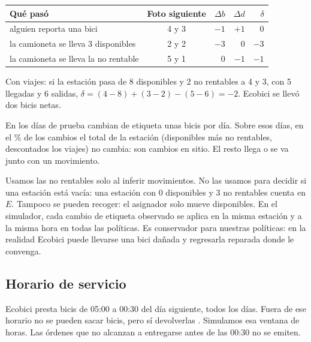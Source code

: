 \documentclass[conference,letterpaper,10pt]{IEEEtran}
\begin{document}
\begin{center}\footnotesize
\begin{tabular}{@{}lcrrr@{}}
\toprule
Qué pasó & Foto siguiente & $\Delta b$ & $\Delta d$ & $\delta$ \\
\midrule
alguien reporta una bici & 4 y 3 & $-1$ & $+1$ & 0 \\
la camioneta se lleva 3 disponibles & 2 y 2 & $-3$ & 0 & $-3$ \\
la camioneta se lleva la no rentable & 5 y 1 & 0 & $-1$ & $-1$ \\
\bottomrule
\end{tabular}
\end{center}

Con viajes: si la estación pasa de 8 disponibles y 2 no rentables a 4 y 3, con 5 llegadas y 6 salidas, $\delta=(4-8)+(3-2)-(5-6)=-2$. Ecobici se llevó dos bicis netas.

En los \rdias{} días de prueba cambian de etiqueta unas \retiquetasDia{} bicis por día. Sobre esos \rdias{} días, en el \renSitioPct\% de los cambios el total de la estación (disponibles más no rentables, descontados los viajes) no cambia: son cambios en sitio. El resto llega o se va junto con un movimiento.

Usamos las no rentables solo al inferir movimientos. No las usamos para decidir si una estación está vacía: una estación con 0 disponibles y 3 no rentables cuenta en $E$. Tampoco se pueden recoger: el asignador solo mueve disponibles. En el simulador, cada cambio de etiqueta observado se aplica en la misma estación y a la misma hora en todas las políticas. Es conservador para nuestras políticas: en la realidad Ecobici puede llevarse una bici dañada y regresarla reparada donde le convenga.

\subsection{Horario de servicio}
Ecobici presta bicis de 05:00 a 00:30 del día siguiente, todos los días. Fuera de ese horario no se pueden sacar bicis, pero sí devolverlas \cite{ecobici_horario}. Simulamos esa ventana de \rventanaHoras{} horas. Las órdenes que no alcanzan a entregarse antes de las 00:30 no se emiten.
\end{document}
